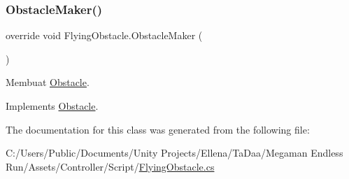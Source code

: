 \subsubsection{\texorpdfstring{Obstacle\+Maker()}{ObstacleMaker()}}
{\footnotesize\ttfamily override void Flying\+Obstacle.\+Obstacle\+Maker (\begin{DoxyParamCaption}{ }\end{DoxyParamCaption})\hspace{0.3cm}{\ttfamily [virtual]}}



Membuat \hyperlink{class_obstacle}{Obstacle}. 



Implements \hyperlink{class_obstacle_a19f2f5d2c3176ee9ea8840862c55aa42}{Obstacle}.



The documentation for this class was generated from the following file\+:\begin{DoxyCompactItemize}
\item 
C\+:/\+Users/\+Public/\+Documents/\+Unity Projects/\+Ellena/\+Ta\+Daa/\+Megaman Endless Run/\+Assets/\+Controller/\+Script/\hyperlink{_flying_obstacle_8cs}{Flying\+Obstacle.\+cs}\end{DoxyCompactItemize}
